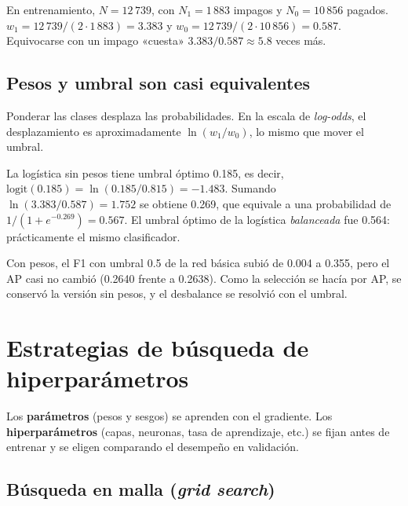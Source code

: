 \documentclass[11pt,a4paper]{article}
\begin{document}
\begin{ejemplo}
En entrenamiento, $N=12\,739$, con $N_1=1\,883$ impagos y $N_0=10\,856$ pagados.
$w_1 = 12\,739/(2\cdot1\,883)=3.383$ y $w_0=12\,739/(2\cdot10\,856)=0.587$. Equivocarse con un impago «cuesta» $3.383/0.587\approx5.8$ veces más.
\end{ejemplo}

\subsection{Pesos y umbral son casi equivalentes}

Ponderar las clases desplaza las probabilidades. En la escala de \textit{log-odds}, el desplazamiento es aproximadamente $\ln(w_1/w_0)$, lo mismo que mover el umbral.

\begin{ejemplo}
La logística sin pesos tiene umbral óptimo 0.185, es decir, $\text{logit}(0.185)=\ln(0.185/0.815)=-1.483$. Sumando $\ln(3.383/0.587)=1.752$ se obtiene 0.269, que equivale a una probabilidad de $1/(1+e^{-0.269})=0.567$. El umbral óptimo de la logística \emph{balanceada} fue 0.564: prácticamente el mismo clasificador.
\end{ejemplo}

\begin{proyecto}
Con pesos, el F1 con umbral 0.5 de la red básica subió de 0.004 a 0.355, pero el AP casi no cambió (0.2640 frente a 0.2638). Como la selección se hacía por AP, se conservó la versión sin pesos, y el desbalance se resolvió con el umbral.
\end{proyecto}

\section{Estrategias de búsqueda de hiperparámetros}

Los \textbf{parámetros} (pesos y sesgos) se aprenden con el gradiente. Los \textbf{hiperparámetros} (capas, neuronas, tasa de aprendizaje, etc.) se fijan antes de entrenar y se eligen comparando el desempeño en validación.

\subsection{Búsqueda en malla (\textit{grid search})}
\end{document}
